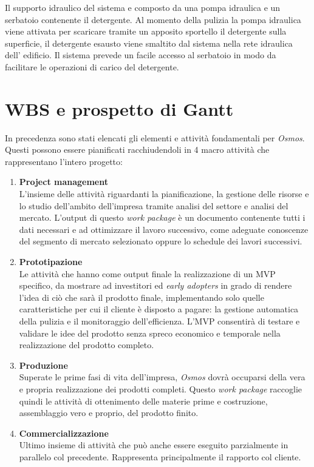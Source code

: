 \documentclass[a4paper, 12pt]{article}
\begin{document}
	Il supporto idraulico del sistema e composto da una pompa idraulica e un serbatoio contenente il detergente. 
	Al momento della pulizia la pompa idraulica viene attivata per scaricare tramite un apposito sportello il detergente sulla superficie,
	il detergente esausto viene smaltito dal sistema nella rete idraulica dell' edificio.
	Il sistema prevede un facile accesso al serbatoio in modo da facilitare le operazioni di carico del detergente.

	\section{WBS e prospetto di Gantt}
	In precedenza sono stati elencati gli elementi e attività fondamentali per \emph{Osmos}. Questi possono essere pianificati racchiudendoli in 4 macro attività che rappresentano l'intero progetto:
	\begin{enumerate}
		\item \textbf{Project management}\\
			  L'insieme delle attività riguardanti la pianificazione, la gestione delle risorse e lo studio dell'ambito dell'impresa tramite analisi del settore e analisi del mercato. L'output di questo \emph{work package} è un documento contenente tutti i dati necessari e ad ottimizzare il lavoro successivo, come adeguate conoscenze del segmento di mercato selezionato oppure lo schedule dei lavori successivi.
		\item \textbf{Prototipazione}\\
			  Le attività che hanno come output finale la realizzazione di un MVP specifico, da mostrare ad investitori ed \emph{early adopters} in grado di rendere l'idea di ciò che sarà il prodotto finale, implementando solo quelle caratteristiche per cui il cliente è disposto a pagare: la gestione automatica della pulizia e il monitoraggio dell'efficienza. L'MVP consentirà di testare e validare le idee del prodotto senza spreco economico e temporale nella realizzazione del prodotto completo.
		\item \textbf{Produzione}\\
			  Superate le prime fasi di vita dell'impresa, \emph{Osmos} dovrà occuparsi della vera e propria realizzazione dei prodotti completi. Questo \emph{work package} raccoglie quindi le attività di ottenimento delle materie prime e costruzione, assemblaggio vero e proprio, del prodotto finito.
		\item \textbf{Commercializzazione}\\
			  Ultimo insieme di attività che può anche essere eseguito parzialmente in parallelo col precedente. Rappresenta principalmente il rapporto col cliente.
	\end{enumerate}
\end{document}
